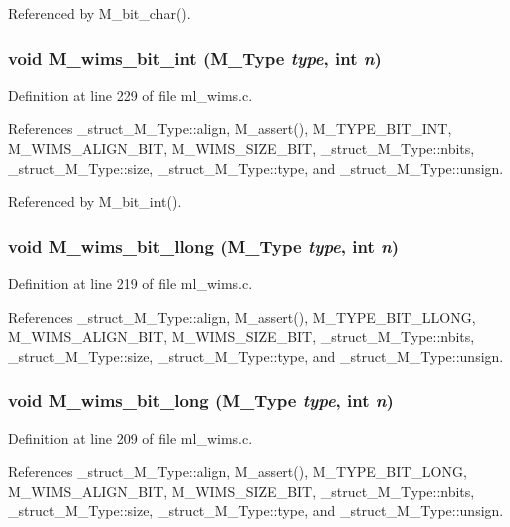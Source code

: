 Referenced by M\_\-bit\_\-char().
\subsubsection{\setlength{\rightskip}{0pt plus 5cm}void M\_\-wims\_\-bit\_\-int (\bf{M\_\-Type} {\em type}, int {\em n})}\label{m__wims_8h_4c6dbdfcc06a2532550db73013f6a63b}




Definition at line 229 of file ml\_\-wims.c.

References \_\-struct\_\-M\_\-Type::align, M\_\-assert(), M\_\-TYPE\_\-BIT\_\-INT, M\_\-WIMS\_\-ALIGN\_\-BIT, M\_\-WIMS\_\-SIZE\_\-BIT, \_\-struct\_\-M\_\-Type::nbits, \_\-struct\_\-M\_\-Type::size, \_\-struct\_\-M\_\-Type::type, and \_\-struct\_\-M\_\-Type::unsign.

Referenced by M\_\-bit\_\-int().
\subsubsection{\setlength{\rightskip}{0pt plus 5cm}void M\_\-wims\_\-bit\_\-llong (\bf{M\_\-Type} {\em type}, int {\em n})}\label{m__wims_8h_dab897a1dc50a1e95b6fdecbd018c07b}




Definition at line 219 of file ml\_\-wims.c.

References \_\-struct\_\-M\_\-Type::align, M\_\-assert(), M\_\-TYPE\_\-BIT\_\-LLONG, M\_\-WIMS\_\-ALIGN\_\-BIT, M\_\-WIMS\_\-SIZE\_\-BIT, \_\-struct\_\-M\_\-Type::nbits, \_\-struct\_\-M\_\-Type::size, \_\-struct\_\-M\_\-Type::type, and \_\-struct\_\-M\_\-Type::unsign.
\subsubsection{\setlength{\rightskip}{0pt plus 5cm}void M\_\-wims\_\-bit\_\-long (\bf{M\_\-Type} {\em type}, int {\em n})}\label{m__wims_8h_4324396ea231660659caa9bc17416734}




Definition at line 209 of file ml\_\-wims.c.

References \_\-struct\_\-M\_\-Type::align, M\_\-assert(), M\_\-TYPE\_\-BIT\_\-LONG, M\_\-WIMS\_\-ALIGN\_\-BIT, M\_\-WIMS\_\-SIZE\_\-BIT, \_\-struct\_\-M\_\-Type::nbits, \_\-struct\_\-M\_\-Type::size, \_\-struct\_\-M\_\-Type::type, and \_\-struct\_\-M\_\-Type::unsign.

